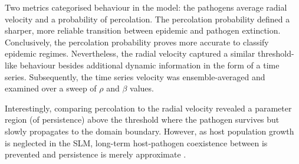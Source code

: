 Two metrics categorised behaviour in the model: the pathogens average radial velocity and a probability of percolation.
The percolation probability defined a sharper, more reliable transition between epidemic and pathogen extinction.
Conclusively, the percolation probability proves more accurate to classify epidemic regimes.
Nevertheless, the radial velocity captured a similar threshold-like behaviour besides additional dynamic information in the form of a time series.
Subsequently, the time series velocity was ensemble-averaged and examined over a sweep of $\rho$ and $\beta$ values. 

Interestingly, comparing percolation to the radial velocity revealed a parameter region (of persistence) above the threshold where the pathogen survives but slowly propagates to the domain boundary.
However, as host population growth is neglected in the SLM, long-term host-pathogen coexistence between is prevented and persistence is merely approximate \cite{gilligan2008epidemiological}. 


